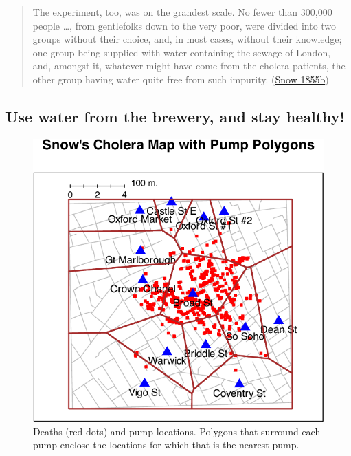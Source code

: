 \documentclass[
  10pt,
  b5paper]{book}
\begin{document}

\begin{quote}
The experiment, too, was on the grandest scale. No fewer than
300,000 people \ldots, from gentlefolks down to the very poor, were
divided into two groups without their choice, and, in most cases,
without their knowledge; one group being supplied with water
containing the sewage of London, and, amongst it, whatever might
have come from the cholera patients, the other group having water
quite free from such impurity. (\protect\hyperlink{ref-snow1855mode}{Snow 1855b})
\end{quote}

\hypertarget{use-water-from-the-brewery-and-stay-healthy}{%
\subsection*{Use water from the brewery, and stay healthy!}\label{use-water-from-the-brewery-and-stay-healthy}}

\begin{figure}[H]

{\centering \includegraphics[width=0.6\linewidth]{08-observational_files/figure-latex/pump-1} 

}

\caption{Deaths (red dots) and pump locations.  Polygons that surround
each pump enclose the locations for which that is the nearest pump.}\label{fig:pump}
\end{figure}
\end{document}
